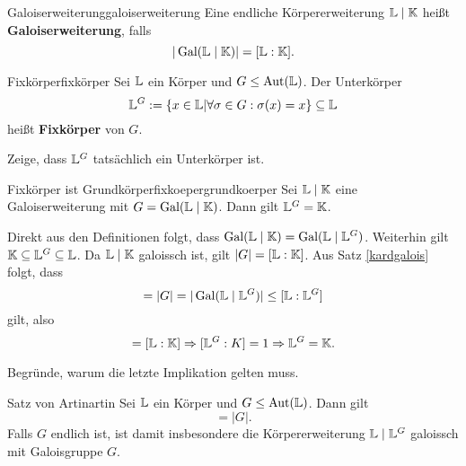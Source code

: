 \begin{definition}{Galoiserweiterung}{galoiserweiterung}
Eine endliche Körpererweiterung $\mathbb{L} \mid \mathbb{K}$ heißt \textbf{Galoiserweiterung}, falls 
\begin{equation}
|\operatorname{\text{Gal}} (\mathbb{L} \mid \mathbb{K})| = [\mathbb{L} : \mathbb{K}].
\end{equation}
\end{definition}
\begin{definition}{Fixkörper}{fixkörper}
Sei $\mathbb{L}$ ein Körper und $G \leq \operatorname{\text{Aut}}(\mathbb{L})$. Der Unterkörper
\begin{equation}
\mathbb{L}^G := \{ x \in \mathbb{L} | \forall \sigma \in G: \sigma(x) = x\} \subseteq \mathbb{L}
\end{equation}
heißt \textbf{Fixkörper} von $G$.
\end{definition}
\begin{übung}
Zeige, dass $\mathbb{L}^G$ tatsächlich ein Unterkörper ist.
\end{übung}
\begin{satz}{Fixkörper ist Grundkörper}{fixkoepergrundkoerper}
Sei $\mathbb{L} \mid \mathbb{K}$ eine Galoiserweiterung mit $G = \operatorname{\text{Gal}}(\mathbb{L} \mid \mathbb{K})$. Dann gilt $\mathbb{L}^G = \mathbb{K}$.
\end{satz}
\begin{beweis}
Direkt aus den Definitionen folgt, dass $\operatorname{\text{Gal}}(\mathbb{L} \mid \mathbb{K}) = \operatorname{\text{Gal}}(\mathbb{L} \mid \mathbb{L}^G)$. Weiterhin gilt $\mathbb{K} \subseteq \mathbb{L}^G \subseteq \mathbb{L}$. Da $\mathbb{L} \mid \mathbb{K}$ galoissch ist, gilt $|G|=[\mathbb{L} : \mathbb{K}]$. Aus Satz \ref{kardgalois} folgt, dass
\begin{equation}
[\L :\K] = |G| = |\Gal(\L \mid \L^G)| \leq [\L : \L^G]
\end{equation}
gilt, also
\begin{equation}
[\L:\L^G] = [\L : \K] \implies [\L^G : K] = 1 \implies \L^G = \K.
\end{equation}
\end{beweis}
\begin{übung}
Begründe, warum die letzte Implikation gelten muss.
\end{übung}
\begin{satz}{Satz von Artin}{artin}
Sei $\mathbb{L}$ ein Körper und $G \leq \operatorname{\text{Aut}} (\mathbb{L})$. Dann gilt
\begin{equation}
[\L: \L^G] = |G|.
\end{equation}
Falls $G$ endlich ist, ist damit insbesondere die Körpererweiterung $\mathbb{L} \mid \mathbb{L}^G$ galoissch mit Galoisgruppe $G$.
\end{satz}
